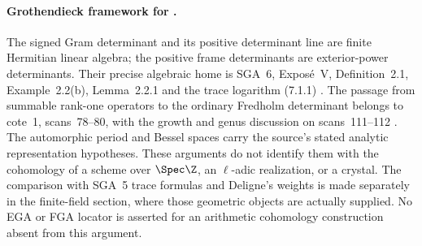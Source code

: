 \paragraph{Grothendieck framework for .}
The signed Gram determinant and its positive determinant line are
finite Hermitian linear algebra; the positive frame determinants
are exterior-power determinants. Their precise algebraic home is
SGA~6, Expos\'e~V, Definition~2.1, Example~2.2(b), Lemma~2.2.1
and the trace logarithm (7.1.1) \cite{sga6}.
The passage from summable rank-one operators to the ordinary
Fredholm determinant belongs to cote~1, scans~78--80, with the
growth and genus discussion on scans~111--112 \cite{archive}.
The automorphic period and Bessel spaces carry the source's stated
analytic representation hypotheses. These arguments do not
identify them with the cohomology of a scheme over $\Spec\Z$,
an $\ell$-adic realization, or a crystal. The comparison with
SGA~5 trace formulas and Deligne's weights is made separately in
the finite-field section, where those geometric objects are
actually supplied. No EGA or FGA locator is asserted for an
arithmetic cohomology construction absent from this argument.
